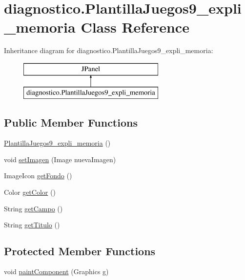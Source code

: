 \hypertarget{classdiagnostico_1_1_plantilla_juegos9__expli__memoria}{}\section{diagnostico.\+Plantilla\+Juegos9\+\_\+expli\+\_\+memoria Class Reference}
\label{classdiagnostico_1_1_plantilla_juegos9__expli__memoria}
Inheritance diagram for diagnostico.\+Plantilla\+Juegos9\+\_\+expli\+\_\+memoria\+:\begin{figure}[H]
\begin{center}
\leavevmode
\includegraphics[height=2.000000cm]{classdiagnostico_1_1_plantilla_juegos9__expli__memoria}
\end{center}
\end{figure}
\subsection*{Public Member Functions}
\begin{DoxyCompactItemize}
\item 
\mbox{\hyperlink{classdiagnostico_1_1_plantilla_juegos9__expli__memoria_a060c1e0ff70fdd4f53697be3d8a75831}{Plantilla\+Juegos9\+\_\+expli\+\_\+memoria}} ()
\item 
void \mbox{\hyperlink{classdiagnostico_1_1_plantilla_juegos9__expli__memoria_a8d7f25aaeff3f8c1f8b48fdf8cd90c65}{set\+Imagen}} (Image nueva\+Imagen)
\item 
Image\+Icon \mbox{\hyperlink{classdiagnostico_1_1_plantilla_juegos9__expli__memoria_a1167e6c51602065881c6508a16941415}{get\+Fondo}} ()
\item 
Color \mbox{\hyperlink{classdiagnostico_1_1_plantilla_juegos9__expli__memoria_a01e6f62fde1675913bb38eef68ea45e3}{get\+Color}} ()
\item 
String \mbox{\hyperlink{classdiagnostico_1_1_plantilla_juegos9__expli__memoria_a5dd552511e9f7d298e3376b48900869e}{get\+Campo}} ()
\item 
String \mbox{\hyperlink{classdiagnostico_1_1_plantilla_juegos9__expli__memoria_a30f195ed2b4ab4b7225e244e1a1f570c}{get\+Titulo}} ()
\end{DoxyCompactItemize}
\subsection*{Protected Member Functions}
\begin{DoxyCompactItemize}
\item 
void \mbox{\hyperlink{classdiagnostico_1_1_plantilla_juegos9__expli__memoria_a6073f776adbb7f1f32eca436fdc62b58}{paint\+Component}} (Graphics g)
\end{DoxyCompactItemize}



